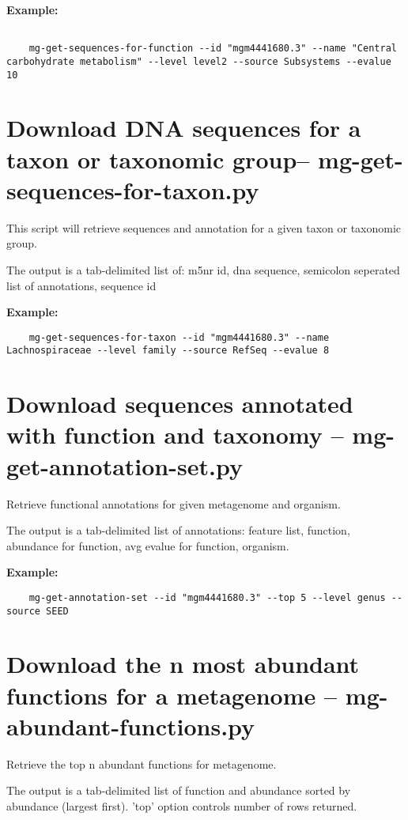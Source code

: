 \textbf{Example:}
\begin{lstlisting}

    mg-get-sequences-for-function --id "mgm4441680.3" --name "Central carbohydrate metabolism" --level level2 --source Subsystems --evalue 10
\end{lstlisting}
\section{Download DNA sequences for a taxon or taxonomic group-- mg-get-sequences-for-taxon.py}

This script will retrieve sequences and annotation for a given taxon or taxonomic group.

The output is a tab-delimited list of: m5nr id, dna sequence, semicolon seperated list of annotations, sequence id

\textbf{Example:}
\begin{lstlisting}
    mg-get-sequences-for-taxon --id "mgm4441680.3" --name Lachnospiraceae --level family --source RefSeq --evalue 8
\end{lstlisting}
\section{Download sequences annotated with function and taxonomy -- mg-get-annotation-set.py}

Retrieve functional annotations for given metagenome and organism.

The output is a tab-delimited list of annotations: feature list, function, abundance for function, avg evalue for function, organism.

\textbf{Example:}
\begin{lstlisting}
    mg-get-annotation-set --id "mgm4441680.3" --top 5 --level genus --source SEED
\end{lstlisting}

\section{Download the n most abundant functions for a metagenome -- mg-abundant-functions.py}

    Retrieve the top n abundant functions for metagenome.

The output is a tab-delimited list of function and abundance sorted by abundance (largest first). 'top' option controls number of rows returned.


